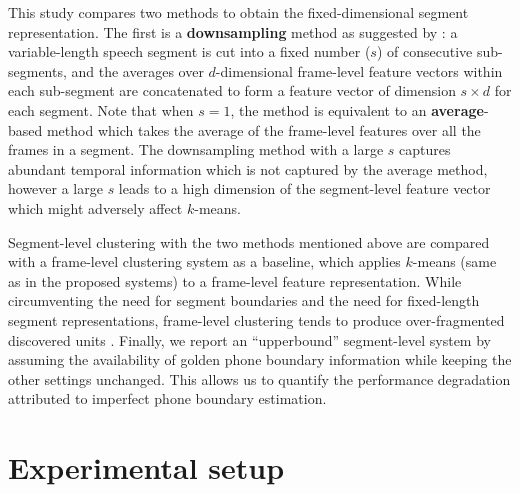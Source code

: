 \documentclass[a4paper]{article}
\begin{document}
This study compares two methods to obtain the fixed-dimensional segment representation. The first is a \textbf{downsampling}   method \cite{levin2013fixed} as suggested by \cite{kamper2017embeded,Bhati2019unsupervised}: a variable-length speech segment is cut into a fixed number ($s$) of consecutive sub-segments, and 
the averages over $d$-dimensional frame-level feature vectors within each sub-segment are concatenated 
to form a  feature vector of dimension $s \times d$ for each segment.
Note that when $s=1$, the method is equivalent to an \textbf{average}-based method \cite{I3EWang} which takes the average of the frame-level features over all the frames in a segment. The downsampling method with a large $s$ captures abundant temporal information which is not captured by the average method, however a large $s$ leads to a high dimension of the segment-level feature vector which might adversely affect $k$-means. 

Segment-level clustering with the two methods mentioned above are compared with a frame-level clustering system as a baseline, which applies  $k$-means (same as  in the proposed systems)
to a frame-level feature representation. While circumventing the need for segment boundaries and the need for fixed-length segment representations, frame-level clustering  tends to produce over-fragmented discovered units \cite{wu2018optimizing,feng2019_TASLP}.  
Finally, we report an ``upperbound'' segment-level system by assuming the availability of golden phone  boundary information while keeping the other settings unchanged. This allows us to quantify the performance degradation attributed to imperfect  phone boundary estimation.


\section{Experimental setup}
\label{sec:setup}
\end{document}
